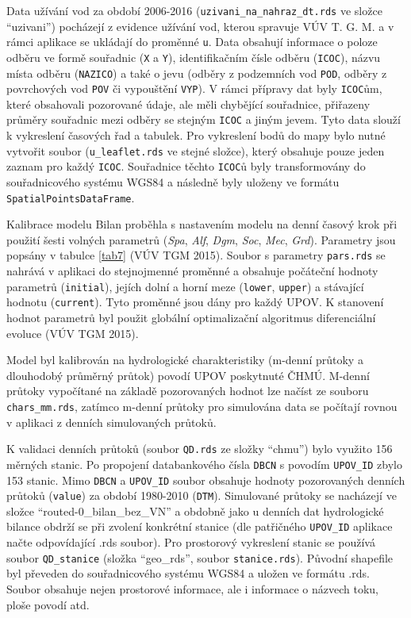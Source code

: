 \documentclass[12pt,]{article}
\begin{document}
\qquad Data užívání vod za období 2006-2016
(\texttt{uzivani\_na\_nahraz\_dt.rds} ve složce \enquote{uzivani})
pocházejí z evidence užívání vod, kterou spravuje VÚV T. G. M. a v rámci
aplikace se ukládají do proměnné \texttt{u}. Data obsahují informace o
poloze odběru ve formě souřadnic (\texttt{X} a \texttt{Y}),
identifikačním čísle odběru (\texttt{ICOC}), názvu místa odběru
(\texttt{NAZICO}) a také o jevu (odběry z podzemních vod \texttt{POD},
odběry z povrchových vod \texttt{POV} či vypouštění \texttt{VYP}). V
rámci přípravy dat byly \texttt{ICOC}ům, které obsahovali pozorované
údaje, ale měli chybějící souřadnice, přiřazeny průměry souřadnic mezi
odběry se stejným \texttt{ICOC} a jiným jevem. Tyto data slouží k
vykreslení časových řad a tabulek. Pro vykreslení bodů do mapy bylo
nutné vytvořit soubor (\texttt{u\_leaflet.rds} ve stejné složce), který
obsahuje pouze jeden zaznam pro každý \texttt{ICOC}. Souřadnice těchto
\texttt{ICOC}ů byly transformovány do souřadnicového systému WGS84 a
následně byly uloženy ve formátu \texttt{SpatialPointsDataFrame}.

\qquad Kalibrace modelu Bilan proběhla s nastavením modelu na denní
časový krok při použití šesti volných parametrů (\emph{Spa}, \emph{Alf},
\emph{Dgm}, \emph{Soc}, \emph{Mec}, \emph{Grd}). Parametry jsou popsány
v tabulce \ref{tab7} (VÚV TGM 2015). Soubor s parametry
\texttt{pars.rds} se nahrává v aplikaci do stejnojmenné proměnné a
obsahuje počáteční hodnoty parametrů (\texttt{initial}), jejích dolní a
horní meze (\texttt{lower}, \texttt{upper}) a stávající hodnotu
(\texttt{current}). Tyto proměnné jsou dány pro každý UPOV. K stanovení
hodnot parametrů byl použit globální optimalizační algoritmus
diferenciální evoluce (VÚV TGM 2015).

\qquad Model byl kalibrován na hydrologické charakteristiky (m-denní
průtoky a dlouhodobý průměrný průtok) povodí UPOV poskytnuté ČHMÚ.
M-denní průtoky vypočítané na základě pozorovaných hodnot lze načíst ze
souboru \texttt{chars\_mm.rds}, zatímco m-denní průtoky pro simulována
data se počítají rovnou v aplikaci z denních simulovaných průtoků.

\qquad K validaci denních průtoků (soubor \texttt{QD.rds} ze složky
\enquote{chmu}) bylo využito 156 měrných stanic. Po propojení
databankového čísla \texttt{DBCN} s povodím \texttt{UPOV\_ID} zbylo 153
stanic. Mimo \texttt{DBCN} a \texttt{UPOV\_ID} soubor obsahuje hodnoty
pozorovaných denních průtoků (\texttt{value}) za období 1980-2010
(\texttt{DTM}). Simulované průtoky se nacházejí ve složce
\enquote{routed-0\_bilan\_bez\_VN} a obdobně jako u denních dat
hydrologické bilance obdrží se při zvolení konkrétní stanice (dle
patřičného \texttt{UPOV\_ID} aplikace načte odpovídající .rds soubor).
Pro prostorový vykreslení stanic se používá soubor \texttt{QD\_stanice}
(složka \enquote{geo\_rds}, soubor \texttt{stanice.rds}). Původní
shapefile byl převeden do souřadnicového systému WGS84 a uložen ve
formátu .rds. Soubor obsahuje nejen prostorové informace, ale i
informace o názvech toku, ploše povodí atd.
\end{document}
